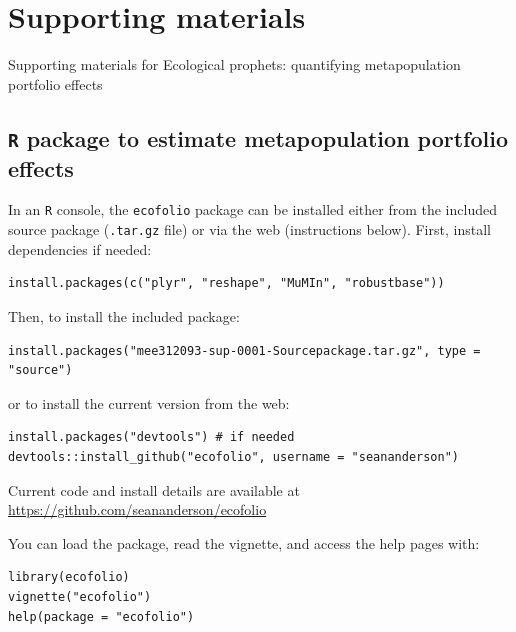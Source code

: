 \chapter{Supporting materials}{Supporting materials for Ecological prophets: quantifying metapopulation portfolio effects}

\section{\texttt{R} package to estimate metapopulation portfolio effects}

In an \texttt{R} console, the \texttt{ecofolio} package can be installed either
from the included source package (\texttt{.tar.gz} file)
or via the web (instructions below). First, install dependencies if needed:

\begin{verbatim}
install.packages(c("plyr", "reshape", "MuMIn", "robustbase"))
\end{verbatim}

\noindent
Then, to install the included package:


\begin{verbatim}
install.packages("mee312093-sup-0001-Sourcepackage.tar.gz", type = "source")
\end{verbatim}


\noindent
or to install the current version from the web:

\begin{verbatim}
install.packages("devtools") # if needed
devtools::install_github("ecofolio", username = "seananderson")
\end{verbatim}

\noindent
Current code and install details are available at\\ \url{https://github.com/seananderson/ecofolio}
\clearpage


\noindent
You can load the package, read the vignette, and access the help pages with:

\begin{verbatim}
library(ecofolio)
vignette("ecofolio")
help(package = "ecofolio")
\end{verbatim}

